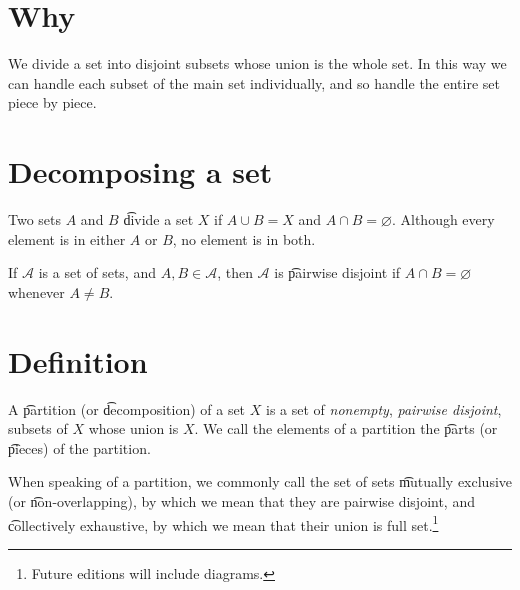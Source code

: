 

\section*{Why}

We divide a set into disjoint subsets whose union is the whole set.
In this way we can handle each subset of the main set individually, and so handle the entire set piece by piece.

\section*{Decomposing a set}

Two sets $A$ and $B$ \t{divide} a set $X$ if $A \cup B = X$ and $A \cap  B = \varnothing$.
Although every element is in either $A$ or $B$, no element is in both.

If $\mathcal{A} $ is a set of sets, and $A, B \in \mathcal{A} $, then $\mathcal{A} $ is \t{pairwise disjoint} if $A \cap  B = \varnothing$ whenever $A \neq B$.

\section*{Definition}

A \t{partition} (or \t{decomposition}) of a set $X$ is a set of \textit{nonempty}, \textit{pairwise disjoint}, subsets of $X$ whose union is $X$.
We call the elements of a partition the \t{parts} (or \t{pieces}) of the partition.

When speaking of a partition, we commonly call the set of sets \t{mutually exclusive} (or \t{non-overlapping}), by which we mean that they are pairwise disjoint, and \t{collectively exhaustive}, by which we mean that their union is full set.\footnote{Future editions will include diagrams.}

\blankpage